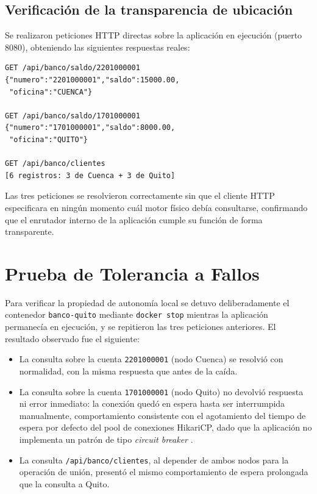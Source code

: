 \documentclass[conference]{IEEEtran}
\begin{document}
\subsection{Verificaci\'on de la transparencia de ubicaci\'on}

Se realizaron peticiones HTTP directas sobre la aplicaci\'on en ejecuci\'on
(puerto 8080), obteniendo las siguientes respuestas reales:

\begin{lstlisting}
GET /api/banco/saldo/2201000001
{"numero":"2201000001","saldo":15000.00,
 "oficina":"CUENCA"}

GET /api/banco/saldo/1701000001
{"numero":"1701000001","saldo":8000.00,
 "oficina":"QUITO"}

GET /api/banco/clientes
[6 registros: 3 de Cuenca + 3 de Quito]
\end{lstlisting}

Las tres peticiones se resolvieron correctamente sin que el cliente HTTP
especificara en ning\'un momento cu\'al motor f\'isico deb\'ia consultarse,
confirmando que el enrutador interno de la aplicaci\'on cumple su funci\'on
de forma transparente.

\section{Prueba de Tolerancia a Fallos}

Para verificar la propiedad de autonom\'ia local se detuvo deliberadamente el
contenedor \texttt{banco-quito} mediante \texttt{docker stop} mientras la
aplicaci\'on permanec\'ia en ejecuci\'on, y se repitieron las tres peticiones
anteriores. El resultado observado fue el siguiente:

\begin{itemize}
    \item La consulta sobre la cuenta \texttt{2201000001} (nodo Cuenca) se
    resolvi\'o con normalidad, con la misma respuesta que antes de la ca\'ida.
    \item La consulta sobre la cuenta \texttt{1701000001} (nodo Quito) no
    devolvi\'o respuesta ni error inmediato: la conexi\'on qued\'o en espera
    hasta ser interrumpida manualmente, comportamiento consistente con el
    agotamiento del tiempo de espera por defecto del pool de conexiones
    HikariCP, dado que la aplicaci\'on no implementa un patr\'on de tipo
    \emph{circuit breaker} \cite{newman2021}.
    \item La consulta \texttt{/api/banco/clientes}, al depender de ambos
    nodos para la operaci\'on de uni\'on, present\'o el mismo comportamiento
    de espera prolongada que la consulta a Quito.
\end{itemize}
\end{document}

